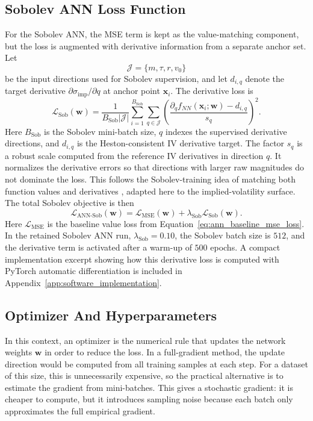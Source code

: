 \subsection{Sobolev ANN Loss Function}
For the Sobolev ANN, the MSE term is kept as the value-matching component, but the loss is augmented with derivative information from a separate anchor set. Let
\[
\mathcal{J}=\{m,\tau,r,v_0\}
\]
be the input directions used for Sobolev supervision, and let \(d_{i,q}\) denote the target derivative \(\partial \sigma_{\mathrm{imp}}/\partial q\) at anchor point \(\mathbf{x}_i\). The derivative loss is
\begin{equation}
\label{eq:ann_sobolev_derivative_loss}
\mathcal{L}_{\mathrm{Sob}}(\mathbf{w})
=
\frac{1}{B_{\mathrm{Sob}}|\mathcal{J}|}
\sum_{i=1}^{B_{\mathrm{Sob}}}
\sum_{q\in\mathcal{J}}
\left(
\frac{\partial_q f_{NN}(\mathbf{x}_i;\mathbf{w})-d_{i,q}}{s_q}
\right)^2.
\end{equation}
Here \(B_{\mathrm{Sob}}\) is the Sobolev mini-batch size, \(q\) indexes the supervised derivative directions, and \(d_{i,q}\) is the Heston-consistent IV derivative target. The factor \(s_q\) is a robust scale computed from the reference IV derivatives in direction \(q\). It normalizes the derivative errors so that directions with larger raw magnitudes do not dominate the loss. This follows the Sobolev-training idea of matching both function values and derivatives \cite{czarnecki2017sobolev}, adapted here to the implied-volatility surface. The total Sobolev objective is then
\begin{equation}
\label{eq:ann_sobolev_total_loss}
\mathcal{L}_{\mathrm{ANN\text{-}Sob}}(\mathbf{w})
=
\mathcal{L}_{\mathrm{MSE}}(\mathbf{w})
+
\lambda_{\mathrm{Sob}}\mathcal{L}_{\mathrm{Sob}}(\mathbf{w}).
\end{equation}
Here \(\mathcal{L}_{\mathrm{MSE}}\) is the baseline value loss from Equation~\eqref{eq:ann_baseline_mse_loss}. In the retained Sobolev ANN run, \(\lambda_{\mathrm{Sob}}=0.10\), the Sobolev batch size is \(512\), and the derivative term is activated after a warm-up of \(500\) epochs. A compact implementation excerpt showing how this derivative loss is computed with PyTorch automatic differentiation is included in Appendix~\ref{app:software_implementation}.

\subsection{Optimizer And Hyperparameters}
\label{sec:ann_optimizer_hyperparameters}
In this context, an optimizer is the numerical rule that updates the network weights \(\mathbf{w}\) in order to reduce the loss. In a full-gradient method, the update direction would be computed from all training samples at each step. For a dataset of this size, this is unnecessarily expensive, so the practical alternative is to estimate the gradient from mini-batches. This gives a stochastic gradient: it is cheaper to compute, but it introduces sampling noise because each batch only approximates the full empirical gradient.

